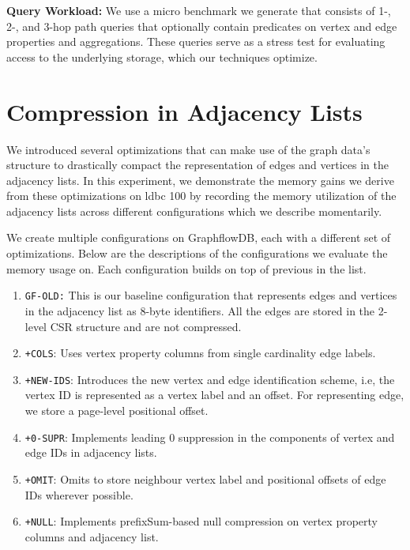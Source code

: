 \noindent \textbf{Query Workload:} We use a micro benchmark we generate that consists of 1-, 2-, and 3-hop path queries that optionally contain predicates on vertex and edge properties and aggregations. These queries serve as a stress test for evaluating access to the underlying storage, which our techniques optimize. 

\section{Compression in Adjacency Lists}
\label{exp:adjacency-list-exp}

We introduced several optimizations that can make use of the graph data's structure to drastically compact the representation of edges and vertices in the adjacency lists. In this experiment, we demonstrate the memory gains we derive from these optimizations on \gls{ldbc} 100 by recording the memory utilization of the adjacency lists across different configurations which we describe momentarily.

We create multiple configurations on GraphflowDB, each with a different set of optimizations. Below are the descriptions of the configurations we evaluate the memory usage on. Each configuration builds on top of previous in the list. 

\begin{enumerate}
	\item \texttt{GF-OLD:} This is our baseline configuration that represents edges and vertices in the adjacency list as 8-byte identifiers. All the edges are stored in the 2-level CSR structure and are not compressed.
	\item \texttt{+COLS}: Uses vertex property columns from single cardinality edge labels. 
	\item \texttt{+NEW-IDS}: Introduces the new vertex and edge identification scheme, i.e, the vertex ID is represented as a vertex label and an offset. For representing edge, we store a page-level positional offset.
	\item \texttt{+0-SUPR}: Implements leading 0 suppression in the components of vertex and edge IDs in adjacency lists.
	\item \texttt{+OMIT}: Omits to store neighbour vertex label and positional offsets of edge IDs wherever possible.
	\item \texttt{+NULL}: Implements prefixSum-based null compression on vertex property columns and adjacency list.
\end{enumerate}

